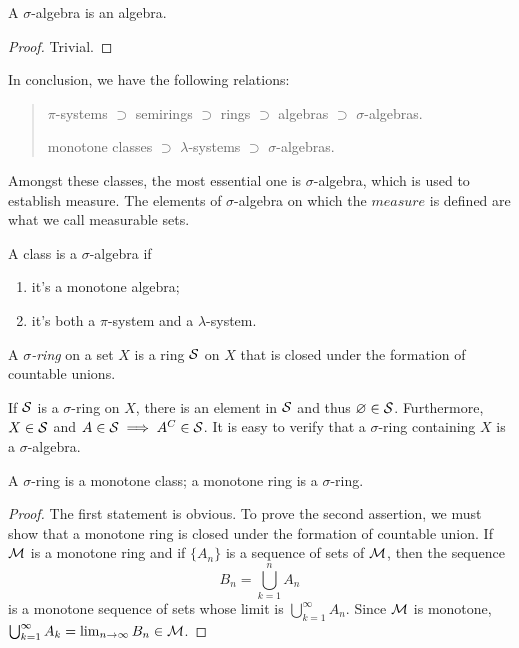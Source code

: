 \begin{prop}
A $\sigma$-algebra is an algebra. 
\end{prop}
\begin{proof}
Trivial. 
\end{proof}

In conclusion, we have the following relations: 
\begin{quote}
$\pi$-systems $\supset$ semirings $\supset$ rings $\supset$ algebras 
$\supset$ $\sigma$-algebras. 

monotone classes $\supset$ $\lambda$-systems $\supset$ $\sigma$-algebras. 
\end{quote}

Amongst these classes, the most essential one is $\sigma$-algebra, which is 
used to establish measure. 
The elements of $\sigma$-algebra on which the $measure$ is defined are what 
we call measurable sets. 

\begin{prop}
\label{prop:measurable_sets:construction_of_sigma_algebra}
A class is a $\sigma$-algebra if 
\begin{enumerate}
    \item it's a monotone algebra; 
    \item it's both a $\pi$-system and a $\lambda$-system. 
\end{enumerate}
\end{prop}

\begin{defn}
A \emph{$\sigma$-ring} on a set $X$ is a ring $\mathcal{S}$ on $X$ that is closed under the 
formation of countable unions. 
\end{defn}
If $\mathcal{S}$ is a $\sigma$-ring on $X$, there is an element in $\mathcal{S}$ and thus 
$\varnothing \in \mathcal{S}$. 
Furthermore, $X \in \mathcal{S}$ and $A \in \mathcal{S} \implies A^C \in \mathcal{S}$. 
It is easy to verify that a $\sigma$-ring containing $X$ is a 
$\sigma$-algebra. 

\begin{prop}
A $\sigma$-ring is a monotone class; a monotone ring is a $\sigma$-ring. 
\end{prop}
\begin{proof}
The first statement is obvious. 
To prove the second assertion, we must show that a monotone ring is closed 
under the formation of countable union. 
If $\mathcal{M}$ is a monotone ring and if $\{A_n\}$ is a sequence of sets of $\mathcal{M}$, 
then the sequence 
\begin{equation*}
    B_n = \bigcup_{k=1}^n A_n
\end{equation*}
is a monotone sequence of sets whose limit is $\bigcup_{k=1}^{\infty} A_n$. 
Since $\mathcal{M}$ is monotone, $\bigcup_{k=1}^\infty A_k = \lim_{n \to \infty} B_n 
\in \mathcal{M}$. 
\end{proof}

